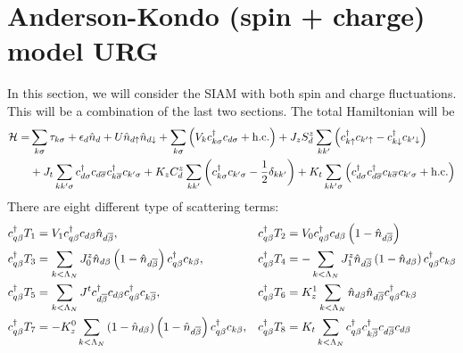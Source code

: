 \documentclass[12pt,twoside]{article}
\numberwithin{equation}{section}
\begin{document}
\section{Anderson-Kondo (spin + charge) model URG}
In this section, we will consider the SIAM with both spin and charge fluctuations. This will be a combination of the last two sections. The total Hamiltonian will be
\begin{equation}\begin{aligned}
	\mathcal{H} =& \sum_{k\sigma}\tau_{k\sigma} + \epsilon_d \hat n_d + U \hat n_{d\uparrow}\hat n_{d \downarrow} + \sum_{k\sigma}\left( V_k c^\dagger_{k\sigma} c_{d\sigma} + \text{h.c.} \right) + J_z S_d^z\sum_{kk^\prime}\left( c^\dagger_{k \uparrow}c_{k^\prime \uparrow} - c^\dagger_{k \downarrow}c_{k^\prime \downarrow} \right) \\
	      &+ J_t \sum_{kk^\prime\sigma}c^\dagger_{d\sigma}c_{d\overline\sigma}c^\dagger_{k\overline\sigma}c_{k^\prime\sigma} + K_z C_d^z \sum_{kk^\prime}\left( c^\dagger_{k\sigma}c_{k^\prime\sigma} - \frac{1}{2}\delta_{kk^\prime} \right) + K_t \sum_{kk^\prime\sigma}\left(c^\dagger_{d\sigma}c^\dagger_{d\overline\sigma}c_{k\overline\sigma}c_{k^\prime\sigma}+\text{h.c.}\right)
\end{aligned}\end{equation}
 There are eight different type of scattering terms:
\begin{equation}\begin{aligned}
	c^\dagger_{q\beta}T_1 &= V_1 c^\dagger_{q\beta}c_{d\beta}\hat n_{d\overline\beta}, &c^\dagger_{q\beta}T_2 &= V_0 c^\dagger_{q\beta}c_{d\beta}\left(1 - \hat n_{d\overline\beta}\right)\\
	c^\dagger_{q\beta}T_3 &= \sum_{k<\Lambda_N}J^z_0 \hat n_{d\beta}\left(1 - \hat n_{d\overline\beta}\right) c^\dagger_{q\beta}c_{k\beta}, &c^\dagger_{q\beta}T_4 &= -\sum_{k<\Lambda_N}J^z_1 \hat n_{d\overline\beta}\left(1 - \hat n_{d\beta}\right) c^\dagger_{q\beta}c_{k\beta}\\
	c^\dagger_{q\beta}T_5 &= \sum_{k<\Lambda_N}J^t c^\dagger_{d\overline\beta}c_{d\beta}c^\dagger_{q\beta}c_{k\overline\beta}, &c^\dagger_{q\beta}T_6 &= K_z^1 \sum_{k<\Lambda_N}\hat n_{d\beta}\hat n_{d\overline\beta}c^\dagger_{q\beta}c_{k\beta}\\
	c^\dagger_{q\beta}T_7 &= -K_z^0 \sum_{k<\Lambda_N}\left(1 - \hat n_{d\beta}\right)\left(1 - \hat n_{d\overline\beta}\right)c^\dagger_{q\beta}c_{k\beta}, &c^\dagger_{q\beta}T_8 &= K_t \sum_{k<\Lambda_N}c^\dagger_{q\beta}c^\dagger_{k\overline\beta}c_{d\overline\beta}c_{d\beta}\\
\end{aligned}\end{equation}
\end{document}
